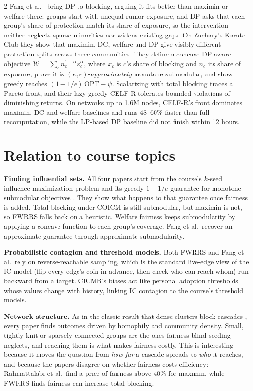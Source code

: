 \documentclass[11pt]{article}
\begin{document}
\begin{multicols}{2}
Fang et al.\ \cite{fang} bring DP to blocking, arguing it fits better than maximin or welfare there: groups start with unequal rumor exposure, and DP asks that each group's share of protection match its share of exposure, so the intervention neither neglects sparse minorities nor widens existing gaps. On Zachary's Karate Club they show that maximin, DC, welfare and DP give visibly different protection splits across three communities. They define a concave DP-aware objective $\mathcal W=\sum_c n_c^{1-\alpha}x_c^{\alpha}$, where $x_c$ is $c$'s share of blocking and $n_c$ its share of exposure, prove it is $(\kappa,\epsilon)$-\emph{approximately} monotone submodular, and show greedy reaches $(1-1/e)\,\mathrm{OPT}-\psi$. Scalarizing with total blocking traces a Pareto front, and their lazy greedy CELF-R tolerates bounded violations of diminishing returns. On networks up to 1.6M nodes, CELF-R's front dominates maximin, DC and welfare baselines and runs 48--60\% faster than full recomputation, while the LP-based DP baseline did not finish within 12 hours.

\section{Relation to course topics}
\textbf{Finding influential sets.} All four papers start from the course's $k$-seed influence maximization problem and its greedy $1-1/e$ guarantee for monotone submodular objectives \cite{kleinberg}. They show what happens to that guarantee once fairness is added. Total blocking under COICM is still submodular, but maximin is not, so FWRRS falls back on a heuristic. Welfare fairness keeps submodularity by applying a concave function to each group's coverage. Fang et al.\ recover an approximate guarantee through approximate submodularity.

\textbf{Probabilistic contagion and threshold models.} Both FWRRS and Fang et al.\ rely on reverse-reachable sampling, which is the standard live-edge view of the IC model \cite{kleinberg} (flip every edge's coin in advance, then check who can reach whom) run backward from a target. CICMB's biases act like personal adoption thresholds whose values change with history, linking IC contagion to the course's threshold models.

\textbf{Network structure.} As in the classic result that dense clusters block cascades \cite{kleinberg}, every paper finds outcomes driven by homophily and community density. Small, tightly knit or sparsely connected groups are the ones fairness-blind seeding neglects, and reaching them is what makes fairness costly. This is interesting because it moves the question from \emph{how far} a cascade spreads to \emph{who} it reaches, and because the papers disagree on whether fairness costs efficiency: Rahmattalabi et al.\ find a price of fairness above 40\% for maximin, while FWRRS finds fairness can increase total blocking.


\end{multicols}
\end{document}
